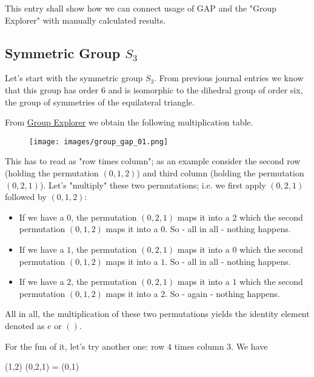 
This entry shall show how we can connect usage of GAP and the "Group Explorer" with manually calculated results.

\subsection{Symmetric Group $S_3$}

Let's start with the symmetric group $S_3$. From previous journal entries we know that this group has order $6$ and is isomorphic to the dihedral group of order six, the group of symmetries of the equilateral triangle.

From \href{https://nathancarter.github.io/group-explorer/GroupInfo.html?groupURL=https://nathancarter.github.io/group-explorer/groups/S_3.group}{Group Explorer} we obtain the following multiplication table.

\begin{figure}[H]
    \centering
    \texttt{[image: images/group\_gap\_01.png]}
\end{figure}
    
This has to read as "row times column"; as an example consider the second row (holding the permutation $(0,1,2)$) and third column (holding the permutation $(0,2,1)$). Let's "multiply" these two permutations; i.e. we first apply $(0,2,1)$ followed by $(0,1,2)$:

\begin{itemize}
    \item If we have a $0$, the permutation $(0,2,1)$ maps it into a $2$ which the second permutation $(0,1,2)$ maps it into a $0$. So - all in all - nothing happens.
    \item If we have a $1$, the permutation $(0,2,1)$ maps it into a $0$ which the second permutation $(0,1,2)$ maps it into a $1$. So - all in all - nothing happens.
    \item If we have a $2$, the permutation $(0,2,1)$ maps it into a $1$ which the second permutation $(0,1,2)$ maps it into a $2$. So - again - nothing happens.
\end{itemize}

All in all, the multiplication of these two permutations yields the identity element denoted as $e$ or $()$.

For the fun of it, let's try another one: row $4$ times column $3$. We have

\bee
(1,2) (0,2,1) = (0,1)
\eee

